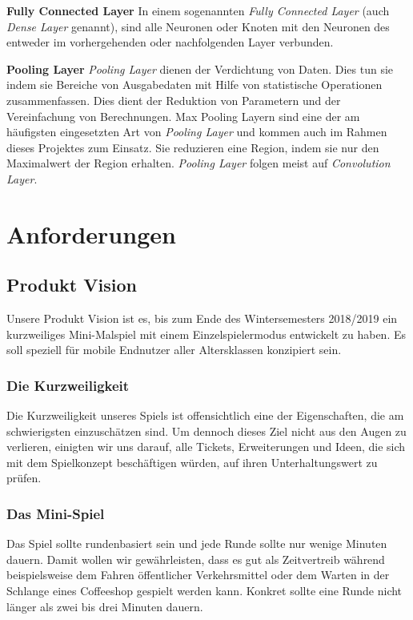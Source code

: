 \documentclass[11pt]{article}
\begin{document}
\textbf{Fully Connected Layer}\newline
In einem sogenannten \textit{Fully Connected Layer} (auch \textit{Dense Layer} genannt), sind alle Neuronen oder Knoten mit den Neuronen des entweder im vorhergehenden oder nachfolgenden Layer verbunden.\parencite{Pattanayak2017}

\textbf{Pooling Layer}\newline
\textit{Pooling Layer} dienen der Verdichtung von Daten. Dies tun sie indem sie Bereiche von Ausgabedaten mit Hilfe von statistische Operationen zusammenfassen. Dies dient der Reduktion von Parametern und der Vereinfachung von Berechnungen.  Max Pooling Layern sind eine der am häufigsten eingesetzten Art von \textit{Pooling Layer} und kommen auch im Rahmen dieses Projektes zum Einsatz. Sie reduzieren eine Region, indem sie nur den Maximalwert der Region erhalten. \textit{Pooling Layer} folgen meist auf \textit{Convolution Layer}.\parencite{Karpathy}\parencite{IanGoodfellowYoshuaBengio2016}


\section{Anforderungen}
\label{chap: Anforderungen}
\subsection{Produkt Vision}
\label{chap: productVision}
Unsere Produkt Vision ist es, bis zum Ende des Wintersemesters 2018/2019 ein kurzweiliges Mini-Malspiel mit einem Einzelspielermodus entwickelt zu haben. Es soll speziell für mobile Endnutzer aller Altersklassen konzipiert sein.
\subsubsection{Die Kurzweiligkeit}
Die Kurzweiligkeit unseres Spiels ist offensichtlich eine der Eigenschaften, die am schwierigsten einzuschätzen sind. Um dennoch dieses Ziel nicht aus den Augen zu verlieren, einigten wir uns darauf, alle Tickets, Erweiterungen und Ideen, die sich mit dem Spielkonzept beschäftigen würden, auf ihren Unterhaltungswert zu prüfen.
\subsubsection{Das Mini-Spiel}
Das Spiel sollte rundenbasiert sein und jede Runde sollte nur wenige Minuten dauern. Damit wollen wir gewährleisten, dass es gut als Zeitvertreib während beispielsweise dem Fahren öffentlicher Verkehrsmittel oder dem Warten in der Schlange eines Coffeeshop gespielt werden kann. Konkret sollte eine Runde nicht länger als zwei bis drei Minuten dauern.
\end{document}
